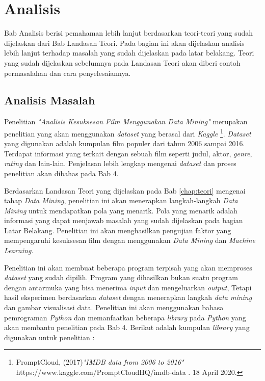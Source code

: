\chapter{Analisis}
\label{chap:analisis}
Bab Analisis berisi pemahaman lebih lanjut berdasarkan teori-teori yang sudah dijelaskan dari Bab Landasan Teori. Pada bagian ini akan dijelaskan analisis lebih lanjut terhadap masalah yang sudah dijelaskan pada latar belakang. Teori yang sudah dijelaskan sebelumnya pada Landasan Teori akan diberi contoh permasalahan dan cara penyelesaiannya. 

\section{Analisis Masalah}
Penelitian \textit{"Analisis Kesuksesan Film Menggunakan Data Mining"} merupakan penelitian yang akan menggunakan \textit{dataset} yang berasal dari \textit{Kaggle} \footnote{PromptCloud, (2017)\textit{"IMDB data from 2006 to 2016"} https://www.kaggle.com/PromptCloudHQ/imdb-data . 18 April 2020.}. \textit{Dataset} yang digunakan adalah kumpulan film populer dari tahun 2006 sampai 2016. Terdapat informasi yang terkait dengan sebuah film seperti judul, aktor, \textit{genre}, \textit{rating} dan lain-lain. Penjelasan lebih lengkap mengenai \textit{dataset} dan proses penelitian akan dibahas pada Bab 4.

Berdasarkan Landasan Teori yang dijelaskan pada Bab \ref{chap:teori} mengenai tahap \textit{Data Mining}, penelitian ini akan menerapkan langkah-langkah \textit{Data Mining} untuk mendapatkan pola yang menarik. Pola yang menarik adalah informasi yang dapat menjawab masalah yang sudah dijelaskan pada bagian Latar Belakang. Penelitian ini akan menghasilkan pengujian faktor yang mempengaruhi kesuksesan film dengan menggunakan \textit{Data Mining} dan \textit{Machine Learning}. 

Penelitian ini akan membuat beberapa program terpisah yang akan memproses \textit{dataset} yang sudah dipilih. Program yang dihasilkan bukan suatu program dengan antarmuka yang bisa menerima \textit{input} dan mengeluarkan \textit{output}, Tetapi hasil eksperimen berdasarkan \textit{dataset} dengan menerapkan langkah \textit{data mining} dan gambar visualisasi data. Penelitian ini akan menggunakan bahasa pemrograman \textit{Python} dan memanfaatkan beberapa  \textit{library} pada \textit{Python} yang akan membantu penelitian pada Bab 4. Berikut adalah kumpulan \textit{library} yang digunakan untuk penelitian : 

